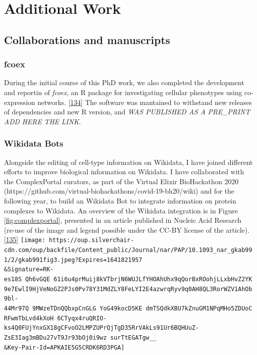 \hypertarget{additional-work}{%
\section{Additional Work}\label{additional-work}}

\hypertarget{collaborations-and-manuscripts}{%
\subsection{Collaborations and manuscripts}\label{collaborations-and-manuscripts}}

\hypertarget{fcoex}{%
\subsubsection{fcoex}\label{fcoex}}

During the initial course of this PhD work, we also completed the development and reportin of \emph{fcoex}, an R package for investigating cellular phenotypes using co-expression networks. {[}\protect\hyperlink{ref-MxIeSJYt}{134}{]} The software was mantained to withstand new releases of dependencies and new R version, and \emph{WAS PUBLISHED AS A PRE\_PRINT ADD HERE THE LINK}.

\hypertarget{wikidata-bots}{%
\subsubsection{Wikidata Bots}\label{wikidata-bots}}

Alongside the editing of cell-type information on Wikidata, I have joined different efforts to improve biological information on Wikidata.
I have collaborated with the ComplexPortal curators, as part of the Virtual Elixir BioHackathon 2020 (https://github.com/virtual-biohackathons/covid-19-bh20/wiki) and for the following year, to build an Wikidata Bot to integrate information on protein complexes to Wikidata. An overview of the Wikidata integration is in Figure \ref{fig:complexportal}, presented in an article published in Nucleic Acid Research (re-use of the image and legend possible under the CC-BY license of the article). {[}\protect\hyperlink{ref-CQRJ53gu}{135}{]}
\texttt{[image: https://oup.silverchair-cdn.com/oup/backfile/Content\_public/Journal/nar/PAP/10.1093\_nar\_gkab991/2/gkab991fig3.jpeg?Expires=1641821957\\\&Signature=RK-es18S~Qh6vGQE~61i6u4prMuij8kVTbrjN6WUJLfYHOAhUhx9qQorBxROohjLLxbHvZ2YK9e7EwlI9HjVeNoGZ2PJs0Pv78Y31MdZLY8FeLYI2E4azwrqRyv9q0AH8QL3RorWZV1AhOb9bl-44Mr97Q~9MWzeTDnQQbxpCnGLG~YoG49kocD5KE~dmTSQdkXBU7kZnuGM1NPqMHo5ZDUoCRFwmTbLvd4kXoH~6CTyqx4ruQRIO-ks4Q0FUjYnxGX18gCFvoO2LMPZUPrQjTgD35RrVAkLs91Ur6BQHUuZ-ZsE3Iag3mBDu27vT9Jr93bOj0i9wz~surTtEGATgw\_\_\\\&Key-Pair-Id=APKAIE5G5CRDK6RD3PGA]}

